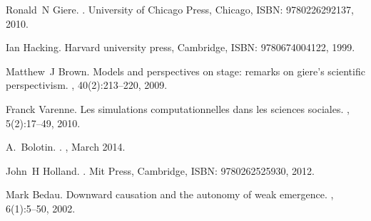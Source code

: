 \documentclass[runningheads,a4paper]{llncs2e/llncs}
\begin{document}
\begin{thebibliography}{10}
Ronald~N Giere.
.
\newblock University of Chicago Press, Chicago, ISBN: 9780226292137, 2010.

Ian Hacking.
\newblock Harvard university press, Cambridge, ISBN: 9780674004122, 1999.

Matthew~J Brown.
\newblock Models and perspectives on stage: remarks on giere’s scientific
  perspectivism.
,
  40(2):213--220, 2009.

Franck Varenne.
\newblock Les simulations computationnelles dans les sciences sociales.
, 5(2):17--49, 2010.

A.~{Bolotin}.
.
, March 2014.

John~H Holland.
.
\newblock Mit Press, Cambridge, ISBN: 9780262525930, 2012.

Mark Bedau.
\newblock Downward causation and the autonomy of weak emergence.
,
  6(1):5--50, 2002.

\end{thebibliography}
\end{document}
